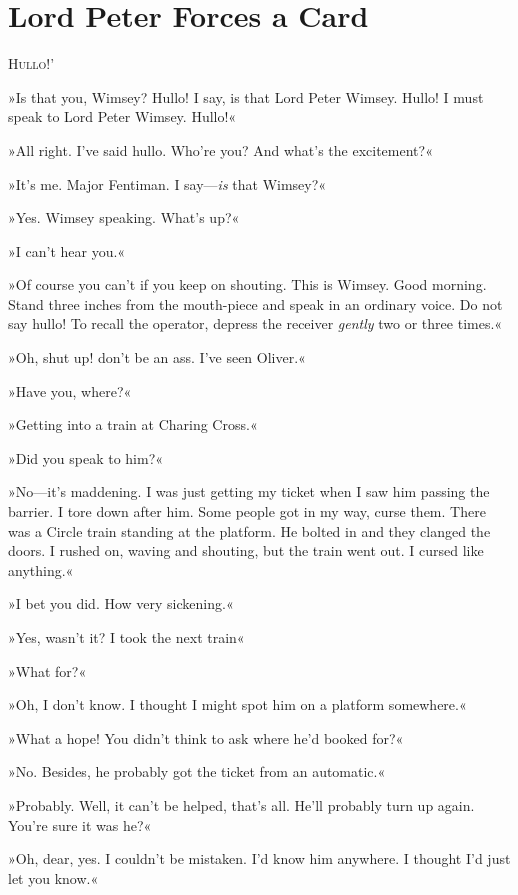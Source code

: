 \chapter{Lord Peter Forces a Card}

\lettrine[lines=4,ante=‘]{H}{ullo}!' 

\zz
»Is that you, Wimsey? Hullo! I say, is that Lord Peter Wimsey. Hullo! I must speak to Lord Peter Wimsey. Hullo!« 

\zz
»All right. I've said hullo. Who're you? And what's the excitement?«

\zz
»It's me. Major Fentiman. I say—\textit{is} that Wimsey?«

»Yes. Wimsey speaking. What's up?«

»I can't hear you.«

»Of course you can't if you keep on shouting. This is Wimsey. Good morning. Stand three inches from the mouth-piece and speak in an ordinary voice. Do not say hullo! To recall the operator, depress the receiver \textit{gently} two or three times.«

»Oh, shut up! don't be an ass. I've seen Oliver.«

»Have you, where?«

»Getting into a train at Charing Cross.«

»Did you speak to him?«

»No—it's maddening. I was just getting my ticket when I saw him passing the barrier. I tore down after him. Some people got in my way, curse them. There was a Circle train standing at the platform. He bolted in and they clanged the doors. I rushed on, waving and shouting, but the train went out. I cursed like anything.«

»I bet you did. How very sickening.«

»Yes, wasn't it? I took the next train\longdash«

»What for?«

»Oh, I don't know. I thought I might spot him on a platform somewhere.«

»What a hope! You didn't think to ask where he'd booked for?«

»No. Besides, he probably got the ticket from an automatic.«

»Probably. Well, it can't be helped, that's all. He'll probably turn up again. You're sure it was he?«

»Oh, dear, yes. I couldn't be mistaken. I'd know him anywhere. I thought I'd just let you know.«


